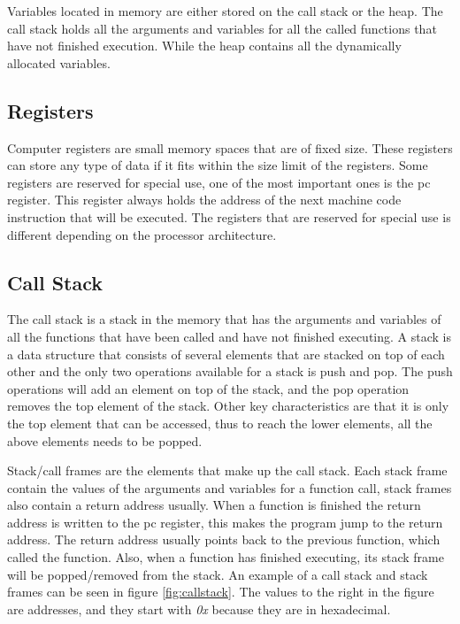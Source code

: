 Variables located in memory are either stored on the call stack or the heap.
The call stack holds all the arguments and variables for all the called functions that have not finished execution.
While the heap contains all the dynamically allocated variables.


\subsection{Registers}
Computer registers are small memory spaces that are of fixed size.
These registers can store any type of data if it fits within the size limit of the registers.
Some registers are reserved for special use, one of the most important ones is the \acrfull{pc} register.
This register always holds the address of the next machine code instruction that will be executed.
The registers that are reserved for special use is different depending on the processor architecture.


\subsection{Call Stack}
\label{sec:callstack}
The call stack is a stack in the memory that has the arguments and variables of all the functions that have been called and have not finished executing.
A stack is a data structure that consists of several elements that are stacked on top of each other and the only two operations available for a stack is push and pop.
The push operations will add an element on top of the stack, and the pop operation removes the top element of the stack.
Other key characteristics are that it is only the top element that can be accessed, thus to reach the lower elements, all the above elements needs to be popped.


Stack/call frames are the elements that make up the call stack.
Each stack frame contain the values of the arguments and variables for a function call, stack frames also contain a return address usually.
When a function is finished the return address is written to the \acrshort{pc} register, this makes the program jump to the return address.
The return address usually points back to the previous function, which called the function.
Also, when a function has finished executing, its stack frame will be popped/removed from the stack.
An example of a call stack and stack frames can be seen in figure \ref{fig:callstack}.
The values to the right in the figure are addresses, and they start with \emph{0x} because they are in hexadecimal.


